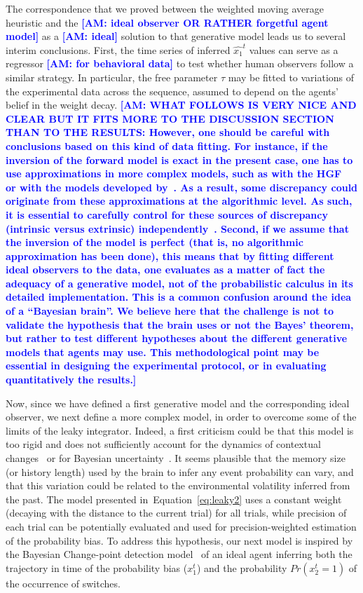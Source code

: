 \documentclass[12pt,english]{article}%
\newcommand{\citep}[1]{\parencite{#1}}
\newcommand{\citet}[1]{\textcite{#1}}
\newcommand{\seeFig}[1]{Figure~\ref{fig:#1}}
\newcommand{\seeEq}[1]{Equation~\ref{eq:#1}}
\newcommand{\AM}[1]{\textbf{\textcolor{blue}{[AM: #1]}}}
\begin{document}
The correspondence that we proved between the weighted moving average heuristic
and the \AM{ideal observer OR RATHER forgetful agent model} as a \AM{ideal} solution to that generative model leads
us to several interim conclusions.
First, the time series of inferred $\hat{x_1}^{t}$ values can serve as a regressor \AM{for behavioral data}
to test whether human observers follow a similar strategy.
In particular, the free parameter $\tau$ may be fitted to variations of the experimental data across the sequence, assumed to depend on the agents' belief in the weight decay.
\AM{WHAT FOLLOWS IS VERY NICE AND CLEAR BUT IT FITS MORE TO THE DISCUSSION SECTION THAN TO THE RESULTS:
However, one should be careful with conclusions based on this kind of data fitting.
For instance, if the inversion of the forward model is exact in the present case,
one has to use approximations in more complex models,
such as with the HGF~\citep{Mathys11}
or with the models developed by~\citet{Wilson13,Wilson18}.
As a result, some discrepancy could originate from these approximations
at the algorithmic level.
As such, it is essential to carefully control for these sources of discrepancy (intrinsic versus extrinsic) independently~\citep{Beck12}.
Second, if we assume that the inversion of the model is perfect
(that is, no algorithmic approximation has been done),
this means that by fitting different ideal observers
to the data, one evaluates as a matter of fact the adequacy of
a generative model, not of the probabilistic calculus in its detailed implementation.
This is a common confusion around the idea of a ``Bayesian brain''.
We believe here that the challenge is not to validate the hypothesis that the brain uses or not the Bayes' theorem,
but rather to test different hypotheses
about the different generative models
that agents may use.
This methodological point may be essential in designing the experimental protocol,
or in evaluating quantitatively the results.}

Now, since we have defined a first generative model
and the corresponding ideal observer,
we next define a more complex model,
in order to overcome some of the limits of the leaky integrator.
Indeed, a first criticism could be that
this model is too rigid and does not sufficiently
account for the dynamics of contextual changes~\citep{Behrens07}
or for Bayesian uncertainty~\citep{Vilares2011}.
It seems plausible that the memory size (or history length) used by the brain to infer any event probability can vary, and that this variation could be related
to the environmental volatility inferred from the past.
The model presented in~\seeEq{leaky2} uses a constant weight
(decaying with the distance to the current trial)
for all trials, while precision of each trial
can be potentially evaluated and used
for precision-weighted estimation of the probability bias.
To address this hypothesis, our next model is inspired
by the Bayesian Change-point detection model~\citep{AdamsMackay2007}
of an ideal agent inferring
both the trajectory in time of the probability bias ($x_1^t$)
and the probability $Pr(x_2^t=1)$ of the occurrence of switches.
\end{document}
